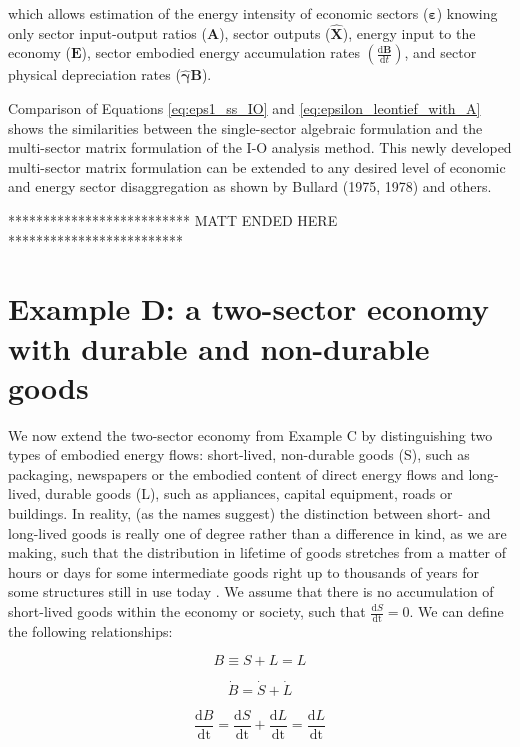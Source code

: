 \documentclass[authoryear,preprint,review,12pt]{elsarticle}
\let\oldhat\hat
\renewcommand{\vec}[1]{\mathbf{#1}}
\renewcommand{\hat}[1]{\oldhat{\mathbf{#1}}}
\begin{document}
\noindent which allows estimation of the energy intensity of economic sectors ($\vec{\varepsilon}$) knowing only sector input-output ratios ($\vec{A}$), sector outputs ($\hat{\vec{X}}$), energy input to the economy ($\vec{E}$), sector embodied energy accumulation rates $\left(\frac{\mathrm{d}\vec{B}}{\mathrm{d}t}\right)$, and sector physical depreciation rates ($\hat{\vec{\gamma}}\vec{B}$).

Comparison of Equations \ref{eq:eps1_ss_IO} and \ref{eq:epsilon_leontief_with_A} shows the similarities between the single-sector algebraic formulation and the multi-sector matrix formulation of the I-O analysis method. This newly developed multi-sector matrix formulation can be extended to any desired level of economic and energy sector disaggregation as shown by Bullard (1975, 1978) and others.

************************** MATT ENDED HERE *************************

\section{Example D: a two-sector economy with durable and non-durable goods}

We now extend the two-sector economy from Example C by distinguishing two types of embodied energy flows: short-lived, non-durable goods (S), such as packaging, newspapers or the embodied content of direct energy flows and long-lived, durable goods (L), such as appliances, capital equipment, roads or buildings. In reality, (as the names suggest) the distinction between short- and long-lived goods is really one of degree rather than a difference in kind, as we are making, such that the distribution in lifetime of goods stretches from a matter of hours or days for some intermediate goods right up to thousands of years for some structures still in use today \cite{Leask2012}. We assume that there is no accumulation of short-lived goods within the economy or society, such that $\frac{\textrm{d}S}{\textrm{dt}} = 0$.  We can define the following relationships:

\begin{equation}\label{eq:D_def_S_L}
B \equiv S + L = L
\end{equation}

\begin{equation}\label{eq:D_def_dot_S_L}
\dot{B} = \dot{S} + \dot{L}
\end{equation}

\begin{equation}\label{eq:D_def_acc_S_L}
\frac{\textrm{d}B}{\textrm{dt}} =\frac{\textrm{d}S}{\textrm{dt}} + \frac{\textrm{d}L}{\textrm{dt}} = \frac{\textrm{d}L}{\textrm{dt}}
\end{equation}
\end{document}
